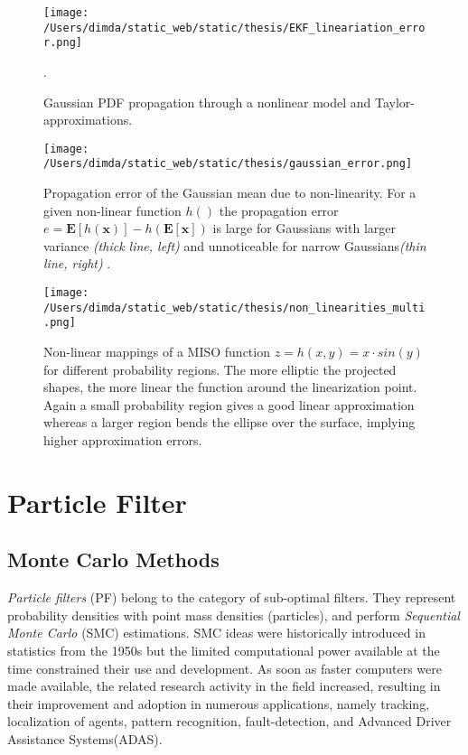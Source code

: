 \begin{figure}[H]
	\centering
	\texttt{[image: /Users/dimda/static\_web/static/thesis/EKF\_lineariation\_error.png]}
	\caption{Gaussian PDF propagation through a nonlinear model and Taylor-approximations\cite{Thrun2005}.}.
	\label{fig:taylor_approximation}
\end{figure}


\begin{figure}[H]
	\centering
	\texttt{[image: /Users/dimda/static\_web/static/thesis/gaussian\_error.png]}
	
	\caption{Propagation error  of the Gaussian mean due to non-linearity. For a given non-linear function $h()$ the propagation error $e=\mathbf{E}[h(\mathbf{x})]-h(\mathbf{E}[\mathbf{x}])$ is large for Gaussians with larger variance \textit{(thick line, left)} and unnoticeable for narrow Gaussians\textit{(thin line, right)} \cite{Sola2011}.}
		
	\label{fig:taylor_approximation2}
\end{figure}


\begin{figure}[H]
	\centering
	\texttt{[image: /Users/dimda/static\_web/static/thesis/non\_linearities\_multi.png]}
	\caption{Non-linear mappings of a MISO function $z=h(x,y) = x \cdot sin(y)$ for different probability regions. The more elliptic the projected shapes, the more linear the function around the linearization point. Again a small probability region gives a good linear approximation whereas a larger region bends the ellipse over the surface, implying higher approximation errors\cite{Sola2011}.}
	\label{fig:nonlinearitiesmulti}
\end{figure}

\section{Particle Filter}
\subsection{Monte Carlo Methods}
\emph{Particle filters} (PF) belong to the category of sub-optimal filters. They represent probability densities with point mass densities (particles), and perform \emph{Sequential Monte Carlo} (SMC) estimations. SMC ideas were historically introduced in statistics from the 1950s but the limited computational power available at the time constrained their use and development. As soon as faster computers were made available, the related research activity in the field increased, resulting in their improvement and adoption in numerous applications, namely tracking, localization of agents, pattern recognition, fault-detection, and Advanced Driver Assistance Systems(ADAS). 

